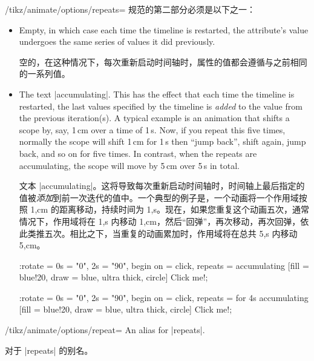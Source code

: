 \begin{key}{/tikz/animate/options/repeats=}
    规范的第二部分必须是以下之一：
    \begin{itemize}
        \item Empty, in which case each time the timeline is restarted, the
            attribute's value undergoes the same series of values it did
            previously.

            空的，在这种情况下，每次重新启动时间轴时，属性的值都会遵循与之前相同的一系列值。
        \item The text |accumulating|. This has the effect that each time the
            timeline is restarted, the last values specified by the timeline is
            \emph{added} to the value from the previous iteration(s). A typical
            example is an animation that shifts a scope by, say, 1\,cm over a
            time of 1\,s. Now, if you repeat this five times, normally the
            scope will shift 1\,cm for 1\,s then ``jump back'', shift again,
            jump back, and so on for five times. In contrast, when the repeats
            are accumulating, the scope will move by 5\,cm over 5\,s in total.
            
            文本 |accumulating|。这将导致每次重新启动时间轴时，时间轴上最后指定的值被\emph{添加}到前一次迭代的值中。一个典型的例子是，一个动画将一个作用域按照 1,cm 的距离移动，持续时间为 1,s。现在，如果您重复这个动画五次，通常情况下，作用域将在 1,s 内移动 1,cm，然后“回弹”，再次移动，再次回弹，依此类推五次。相比之下，当重复的动画累加时，作用域将在总共 5,s 内移动 5,cm。
\begin{codeexample}[
    preamble={\usetikzlibrary{animations}},
    animation list={1,2,3,4,5},
]
\tikz \node :rotate = { 0s = "0", 2s = "90", begin on = click,
                        repeats = accumulating }
    [fill = blue!20, draw = blue, ultra thick, circle] {Click me!};
\end{codeexample}
\begin{codeexample}[
    preamble={\usetikzlibrary{animations}},
    animation list={1,2,3,4,5},
]
\tikz \node :rotate = { 0s = "0", 2s = "90", begin on = click,
                        repeats = for 4s accumulating }
    [fill = blue!20, draw = blue, ultra thick, circle] {Click me!};
\end{codeexample}
    \end{itemize}
\end{key}

\begin{key}{/tikz/animate/options/repeat=}
    An alias for |repeats|.

    对于 |repeats| 的别名。

\end{key}


